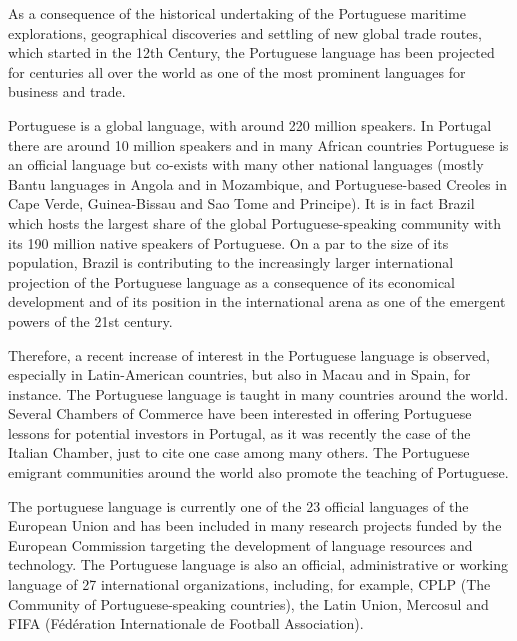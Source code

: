 \begin{multicols}{2}
 As a consequence of the historical undertaking of the Portuguese maritime explorations, geographical discoveries and settling of new global trade routes, which started in the 12th Century, the Portuguese language has been projected for centuries all over the world as one of the most prominent languages for business and trade.

Portuguese is a global language, with around 220 million speakers. In Portugal there are around 10 million speakers\cite{census} and in many African countries Portuguese is an official language but co-exists with many other national languages (mostly Bantu languages in Angola and in Mozambique, and Portuguese-based Creoles in Cape Verde, Guinea-Bissau and Sao Tome and Principe).  It is in fact Brazil which hosts the largest share of the global Portuguese-speaking community with its 190 million native speakers of Portuguese. On a par to the size of its population, Brazil is contributing to the increasingly larger international projection of the Portuguese language as a consequence of its economical development and of its position in the international arena as one of the emergent powers of the 21st century. 


Therefore, a recent increase of interest in the Portuguese language is observed, especially in Latin-American countries, but also in Macau and in Spain, for instance. The Portuguese language is taught in many countries around the world\cite{camoes2}. Several Chambers of Commerce have been interested in offering Portuguese lessons for potential investors in Portugal, as it was recently the case of the Italian Chamber, just to cite one case among many others. The Portuguese emigrant communities around the world also promote the teaching of Portuguese.


The portuguese language is currently one of the 23 official languages of the European Union and has been included in many research projects funded by the European Commission targeting the development of language resources and technology. The Portuguese language is also an official, administrative or working language of 27 international organizations, including, for example, CPLP (The Community of Portuguese-speaking countries), the Latin Union, Mercosul and FIFA (Fédération Internationale de Football Association). 


\end{multicols}
